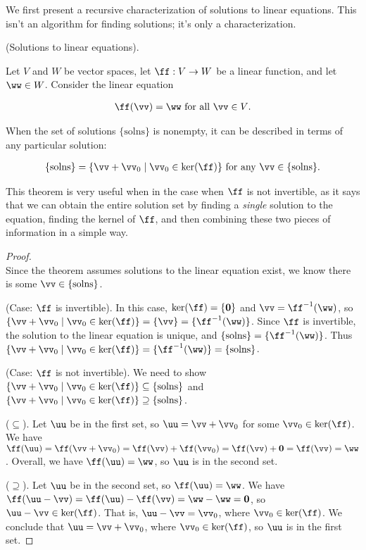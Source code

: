 We first present a recursive characterization of solutions to linear equations. This isn't an algorithm for finding solutions; it's only a characterization.

\begin{theorem}
\label{ch::lin_alg::thm::solutions_to_linear_equations}
    (Solutions to linear equations).

    Let $V$ and $W$ be vector spaces, let $\ff:V \rightarrow W$ be a linear function, and let $\ww \in W$. Consider the linear equation

    \begin{align*}
        \ff(\vv) = \ww \text{ for all $\vv \in V$}.
    \end{align*}
    
    When the set of solutions $\{\text{solns}\}$ is nonempty, it can be described in terms of any particular solution:

    \begin{align*}
        \{\text{solns}\} = \{ \vv + \vv_0 \mid \vv_0 \in \ker(\ff) \} \text{ for any $\vv \in \{\text{solns}\}$}.
    \end{align*}

    This theorem is very useful when in the case when $\ff$ is not invertible, as it says that we can obtain the entire solution set by finding a \textit{single} solution to the equation, finding the kernel of $\ff$, and then combining these two pieces of information in a simple way.
\end{theorem}

\begin{proof}
    \mbox{} \\

    Since the theorem assumes solutions to the linear equation exist, we know there is some $\vv \in \{\text{solns}\}$.
    
    \indent (Case: $\ff$ is invertible). In this case, $\ker(\ff) = \{\mathbf{0}\}$ and $\vv = \ff^{-1}(\ww)$, so $\{ \vv + \vv_0 \mid \vv_0 \in \ker(\ff) \} = \{ \vv \} = \{\ff^{-1}(\ww)\}$. Since $\ff$ is invertible, the solution to the linear equation is unique, and $\{\text{solns}\} = \{\ff^{-1}(\ww)\}$. Thus $\{ \vv + \vv_0 \mid \vv_0 \in \ker(\ff) \} = \{\ff^{-1}(\ww)\} = \{\text{solns}\}$.

    (Case: $\ff$ is not invertible). We need to show $\{ \vv + \vv_0 \mid \vv_0 \in \ker(\ff)\} \subseteq \{\text{solns}\}$ and $\{ \vv + \vv_0 \mid \vv_0 \in \ker(\ff)\} \supseteq \{\text{solns}\}$.

    \indent \indent ($\subseteq$). Let $\uu$ be in the first set, so $\uu = \vv + \vv_0$ for some $\vv_0 \in \ker(\ff)$. We have $\ff(\uu) = \ff(\vv + \vv_0) = \ff(\vv) + \ff(\vv_0) = \ff(\vv) + \mathbf{0} = \ff(\vv) = \ww$. Overall, we have $\ff(\uu) = \ww$, so $\uu$ is in the second set.

    \indent \indent ($\supseteq$). Let $\uu$ be in the second set, so $\ff(\uu) = \ww$. We have $\ff(\uu - \vv) = \ff(\uu) - \ff(\vv) = \ww - \ww = \mathbf{0}$, so $\uu - \vv \in \ker(\ff)$. That is, $\uu - \vv = \vv_0$, where $\vv_0 \in \ker(\ff)$. We conclude that $\uu = \vv + \vv_0$, where $\vv_0 \in \ker(\ff)$, so $\uu$ is in the first set.
\end{proof}

